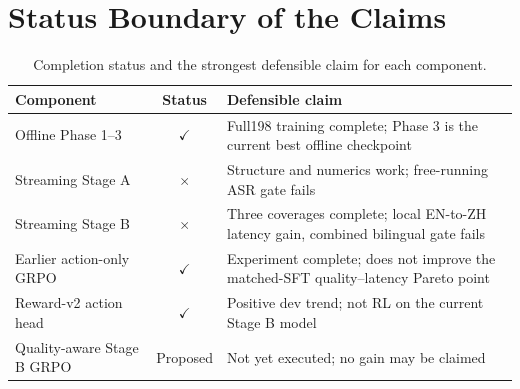 \documentclass[11pt,a4paper]{article}
\newcommand{\checked}{\textcolor{streamgreen}{\ensuremath{\checkmark}}}
\newcommand{\failed}{\textcolor{red!70!black}{\ensuremath{\times}}}
\begin{document}
\section{Status Boundary of the Claims}

\begin{table}[H]
\centering
\caption{Completion status and the strongest defensible claim for each component.}
\begin{tabularx}{\textwidth}{lCY}
\toprule
Component & Status & Defensible claim \\
\midrule
Offline Phase 1--3 & \checked & Full198 training complete; Phase 3 is the current best offline checkpoint \\
Streaming Stage A & \failed & Structure and numerics work; free-running ASR gate fails \\
Streaming Stage B & \failed & Three coverages complete; local EN-to-ZH latency gain, combined bilingual gate fails \\
Earlier action-only GRPO & \checked & Experiment complete; does not improve the matched-SFT quality--latency Pareto point \\
Reward-v2 action head & \checked & Positive dev trend; not RL on the current Stage B model \\
Quality-aware Stage B GRPO & Proposed & Not yet executed; no gain may be claimed \\
\bottomrule
\end{tabularx}
\end{table}



\end{document}
